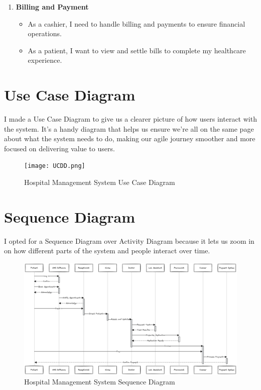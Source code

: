 \documentclass[12pt]{article} %
\begin{document}
\begin{enumerate}
      \item {\small \textbf{Billing and Payment}}
      \begin{itemize}
        \item {\footnotesize As a cashier, I need to handle billing and payments to ensure financial operations.}
        \item {\footnotesize As a patient, I want to view and settle bills to complete my healthcare experience.}
      \end{itemize}
    \end{enumerate}

\section*{Use Case Diagram}
I made a Use Case Diagram to give us a clearer picture of how users interact with the system. It's a handy diagram that helps us ensure we're all on the same page about what the system needs to do, making our agile journey smoother and more focused on delivering value to users.

\begin{figure}[ht]
  \centering
  \texttt{[image: UCDD.png]}
  \caption{Hospital Management System Use Case Diagram}
  \label{fig:ust}
  \end{figure}

  \section*{Sequence Diagram}
  I opted for a Sequence Diagram over Activity Diagram because it lets us zoom in on how different parts of the system and people interact over time.


  \begin{figure}[ht]
    \centering
    \includegraphics[width=\linewidth]{Sdt.png}
    \caption{Hospital Management System Sequence Diagram}
    \label{fig:ust}
    \end{figure}
    
  

\end{document}
